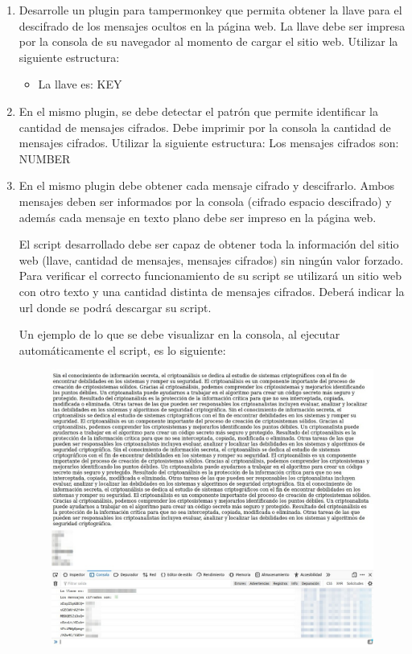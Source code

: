 \documentclass[letter,12pt]{article}
\begin{document}
\begin{enumerate}
    \item Desarrolle un plugin para tampermonkey que permita obtener la llave para el descifrado de los mensajes ocultos en la página web. La llave debe ser impresa por la consola de su navegador al momento de cargar el sitio web. Utilizar la siguiente estructura:
    \begin{itemize}
        \item   La llave es: KEY
    \end{itemize}
    
    \item En el mismo plugin, se debe detectar el patrón que permite identificar la cantidad de mensajes cifrados. Debe imprimir por la consola la cantidad de mensajes cifrados. Utilizar la siguiente estructura:
    Los mensajes cifrados son: NUMBER
    
    \item En el mismo plugin debe obtener cada mensaje cifrado y descifrarlo. Ambos mensajes deben ser informados por la consola (cifrado espacio descifrado) y además cada mensaje en texto plano debe ser impreso en la página web. \par
    El script desarrollado debe ser capaz de obtener toda la información del sitio web (llave, cantidad de mensajes, mensajes cifrados) sin ningún valor forzado. Para verificar el correcto funcionamiento de su script se utilizará un sitio web con otro texto y una cantidad distinta de mensajes cifrados. Deberá indicar la url donde se podrá descargar su script.\par
    Un ejemplo de lo que se debe visualizar en la consola, al ejecutar automáticamente el script, es lo siguiente:

    \begin{figure}[H]
        \centering
        \includegraphics[width=16cm]{Desarrollo/ejemplo.jpg}
        \label{fig:ejemplo}
    \end{figure}

\end{enumerate}
\end{document}
